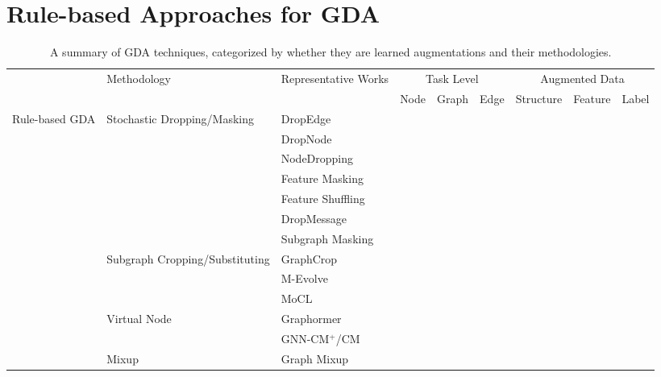 \documentclass[11pt]{article}
\newcommand{\cmark}{\ding{51}}%
\begin{document}
\section{Rule-based Approaches for GDA}
\label{sec:tong_simpleaug}


\begin{table}[!th]
\scriptsize
\caption{A summary of GDA techniques, categorized by whether they are learned augmentations and their methodologies.}
\label{tab:methods}
\centering
\begin{tabular}{l|l|l|ccc|ccc}
\toprule
\multicolumn{1}{c}{} & \multirow{2}{*}{Methodology} & \multirow{2}{*}{Representative Works} & \multicolumn{3}{|c}{Task Level} & \multicolumn{3}{|c}{Augmented Data}  \\
\multicolumn{2}{c|}{} & & Node & Graph & Edge & Structure & Feature & Label \\
\midrule
\multirow{27}{*}{Rule-based GDA}
& \multirow{7}{*}{Stochastic Dropping/Masking}
& DropEdge~\cite{rong2019dropedge} & \cmark &  &  & \cmark &  &  \\
& & DropNode~\cite{feng2020graph} &  & \cmark &  &  & \cmark &  \\
& & NodeDropping~\cite{you2020graph} &  & \cmark &  & \cmark &  &  \\
& & Feature Masking~\cite{thakoor2022largescale} & \cmark &  &  &  & \cmark &  \\
& & Feature Shuffling~\cite{velickovic2019deep} & \cmark &  &  &  & \cmark &  \\
& & DropMessage~\cite{fang2022dropmessage} & \cmark &  & \cmark &  & \cmark &  \\
& & Subgraph Masking~\cite{you2020graph} &  & \cmark &  & \cmark & \cmark &  \\
\cmidrule(lr){2-9}
& \multirow{3}{*}{Subgraph Cropping/Substituting}
& GraphCrop~\cite{wang2020graphcrop} &  & \cmark &  & \cmark &  &  \\
& & M-Evolve~\cite{zhou2020data} &  & \cmark &  & \cmark &  &  \\
& & MoCL~\cite{sun2021mocl} &  & \cmark &  & \cmark & \cmark &  \\
\cmidrule(lr){2-9}
& \multirow{2}{*}{Virtual Node}
& Graphormer~\cite{ying2021transformers} &  & \cmark &  & \cmark &  &  \\
& & GNN-CM$^+$/CM~\cite{hwang2021revisiting} &  &  & \cmark & \cmark &  &  \\
\cmidrule(lr){2-9}
& \multirow{4}{*}{Mixup}
& Graph Mixup~\cite{wang2021mixup} & \cmark & \cmark &  &  &  & \cmark \\

\end{tabular}
\end{table}
\end{document}
